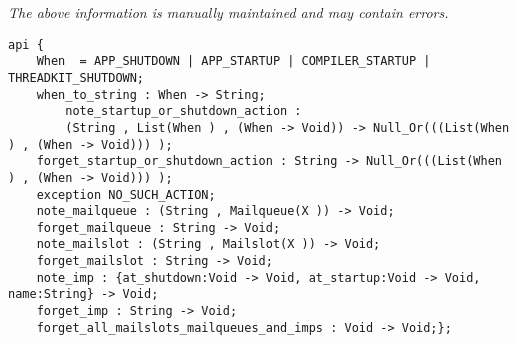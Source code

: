 \label{api:Run\_At}

{\tiny \it The above information is manually maintained and may contain errors.}
\begin{verbatim}
api {
    When  = APP_SHUTDOWN | APP_STARTUP | COMPILER_STARTUP | THREADKIT_SHUTDOWN;
    when_to_string : When -> String;
        note_startup_or_shutdown_action :
        (String , List(When ) , (When -> Void)) -> Null_Or(((List(When ) , (When -> Void))) );
    forget_startup_or_shutdown_action : String -> Null_Or(((List(When ) , (When -> Void))) );
    exception NO_SUCH_ACTION;
    note_mailqueue : (String , Mailqueue(X )) -> Void;
    forget_mailqueue : String -> Void;
    note_mailslot : (String , Mailslot(X )) -> Void;
    forget_mailslot : String -> Void;
    note_imp : {at_shutdown:Void -> Void, at_startup:Void -> Void, name:String} -> Void;
    forget_imp : String -> Void;
    forget_all_mailslots_mailqueues_and_imps : Void -> Void;};
\end{verbatim}

